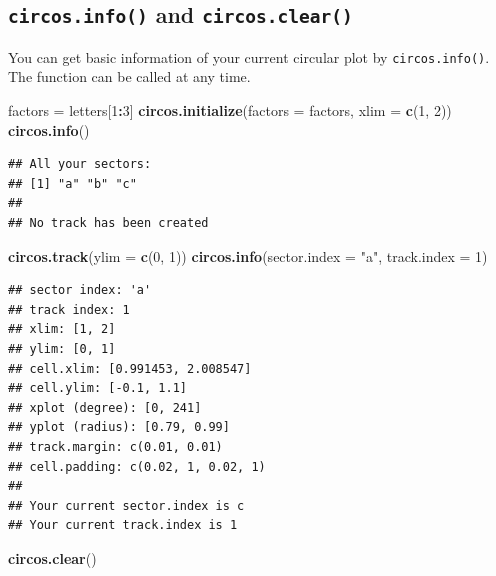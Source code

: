 \documentclass[]{book}
\newenvironment{Shaded}{\begin{snugshade}}{\end{snugshade}}
\newcommand{\KeywordTok}[1]{\textcolor[rgb]{0.13,0.29,0.53}{\textbf{#1}}}
\newcommand{\DataTypeTok}[1]{\textcolor[rgb]{0.13,0.29,0.53}{#1}}
\newcommand{\DecValTok}[1]{\textcolor[rgb]{0.00,0.00,0.81}{#1}}
\newcommand{\StringTok}[1]{\textcolor[rgb]{0.31,0.60,0.02}{#1}}
\newcommand{\OperatorTok}[1]{\textcolor[rgb]{0.81,0.36,0.00}{\textbf{#1}}}
\newcommand{\NormalTok}[1]{#1}
\theoremstyle{definition}
\theoremstyle{definition}
\theoremstyle{remark}
\begin{document}
\subsection{\texorpdfstring{\texttt{circos.info()} and
\texttt{circos.clear()}}{circos.info() and circos.clear()}}\label{circos-info-and-circos-clear}

You can get basic information of your current circular plot by
\texttt{circos.info()}. The function can be called at any time.

\begin{Shaded}
\begin{Highlighting}[]
\NormalTok{factors =}\StringTok{ }\NormalTok{letters[}\DecValTok{1}\OperatorTok{:}\DecValTok{3}\NormalTok{]}
\KeywordTok{circos.initialize}\NormalTok{(}\DataTypeTok{factors =}\NormalTok{ factors, }\DataTypeTok{xlim =} \KeywordTok{c}\NormalTok{(}\DecValTok{1}\NormalTok{, }\DecValTok{2}\NormalTok{))}
\KeywordTok{circos.info}\NormalTok{()}
\end{Highlighting}
\end{Shaded}

\begin{verbatim}
## All your sectors:
## [1] "a" "b" "c"
## 
## No track has been created
\end{verbatim}

\begin{Shaded}
\begin{Highlighting}[]
\KeywordTok{circos.track}\NormalTok{(}\DataTypeTok{ylim =} \KeywordTok{c}\NormalTok{(}\DecValTok{0}\NormalTok{, }\DecValTok{1}\NormalTok{))}
\KeywordTok{circos.info}\NormalTok{(}\DataTypeTok{sector.index =} \StringTok{"a"}\NormalTok{, }\DataTypeTok{track.index =} \DecValTok{1}\NormalTok{)}
\end{Highlighting}
\end{Shaded}

\begin{verbatim}
## sector index: 'a'
## track index: 1
## xlim: [1, 2]
## ylim: [0, 1]
## cell.xlim: [0.991453, 2.008547]
## cell.ylim: [-0.1, 1.1]
## xplot (degree): [0, 241]
## yplot (radius): [0.79, 0.99]
## track.margin: c(0.01, 0.01)
## cell.padding: c(0.02, 1, 0.02, 1)
## 
## Your current sector.index is c
## Your current track.index is 1
\end{verbatim}

\begin{Shaded}
\begin{Highlighting}[]
\KeywordTok{circos.clear}\NormalTok{()}
\end{Highlighting}
\end{Shaded}
\end{document}
